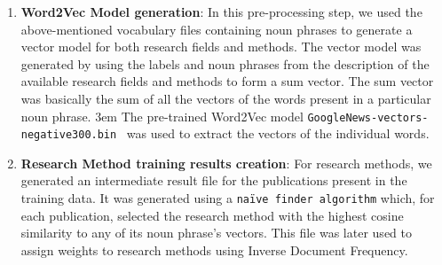 \documentclass[runningheads]{llncs}
\begin{document}
\begin{enumerate}
    \smallskip
    \item \textbf{Word2Vec Model generation}: In this pre-processing step, we used the above-mentioned vocabulary files containing noun phrases to generate a vector model for both research fields and methods. %
    The vector model was generated by using the labels and noun phrases from the description of the available research fields and methods to form a sum vector.
    The sum vector was basically the sum of all the vectors of the words present in a particular noun phrase. %
    \emergencystretch 3em {The pre-trained Word2Vec model \texttt{GoogleNews-vectors-negative300.bin}~\cite{DBLP:journals/corr/abs-1301-3781} was used to extract the vectors of the individual words.}
    \smallskip
    \item \textbf{Research Method training results creation}: For research methods, we generated an intermediate %
    result file for the publications present in the training data. %
    It was generated using a \texttt{naïve finder algorithm} which, for each publication, selected the research method with the highest cosine similarity to any of its noun phrase’s vectors. This file was later used to assign weights to research methods using Inverse Document Frequency.
\end{enumerate}


\end{document}
